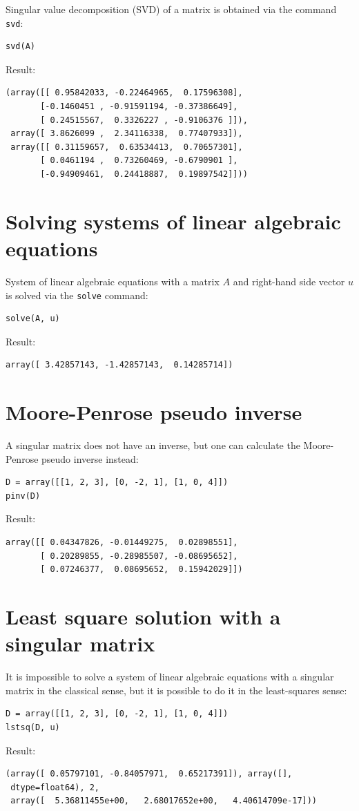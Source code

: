\documentclass[article,A4,12pt]{llncs}
\begin{document}
Singular value decomposition (SVD) of a matrix is obtained via the command {\tt svd}:
\begin{verbatim}
svd(A)
\end{verbatim}
Result:
\begin{verbatim}
(array([[ 0.95842033, -0.22464965,  0.17596308],
       [-0.1460451 , -0.91591194, -0.37386649],
       [ 0.24515567,  0.3326227 , -0.9106376 ]]), 
 array([ 3.8626099 ,  2.34116338,  0.77407933]), 
 array([[ 0.31159657,  0.63534413,  0.70657301],
       [ 0.0461194 ,  0.73260469, -0.6790901 ],
       [-0.94909461,  0.24418887,  0.19897542]]))
\end{verbatim}


\section{Solving systems of linear algebraic equations}

System of linear algebraic equations with a matrix $A$ and right-hand 
side vector $u$ is solved via the {\tt solve} command:
\begin{verbatim}
solve(A, u)
\end{verbatim}
Result:
\begin{verbatim}
array([ 3.42857143, -1.42857143,  0.14285714])
\end{verbatim}



\section{Moore-Penrose pseudo inverse}

A singular matrix does not have an inverse, but one can calculate the Moore-Penrose
pseudo inverse instead:
\begin{verbatim}
D = array([[1, 2, 3], [0, -2, 1], [1, 0, 4]])
pinv(D)
\end{verbatim}
Result:
\begin{verbatim}
array([[ 0.04347826, -0.01449275,  0.02898551],
       [ 0.20289855, -0.28985507, -0.08695652],
       [ 0.07246377,  0.08695652,  0.15942029]])
\end{verbatim}

\section{Least square solution with a singular matrix}

It is impossible to solve a system of linear algebraic equations with a singular
matrix in the classical sense, but it is possible to do it in the least-squares
sense:
\begin{verbatim}
D = array([[1, 2, 3], [0, -2, 1], [1, 0, 4]])
lstsq(D, u)
\end{verbatim}
Result:
\begin{verbatim}
(array([ 0.05797101, -0.84057971,  0.65217391]), array([], 
 dtype=float64), 2, 
 array([  5.36811455e+00,   2.68017652e+00,   4.40614709e-17]))
\end{verbatim}


\end{document}
